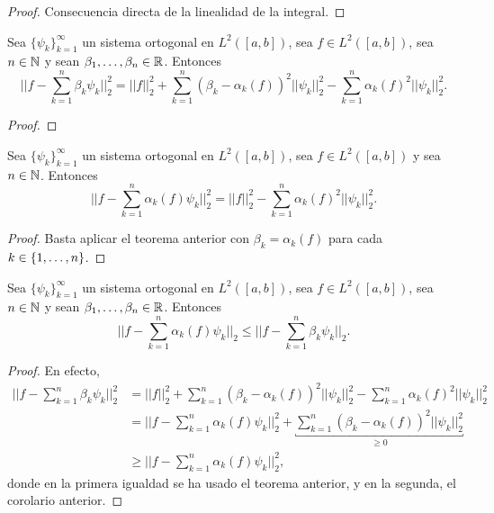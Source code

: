 \documentclass[a4paper, 12pt, extrafontsizes]{memoir}
\begin{document}
\begin{proof}
    Consecuencia directa de la linealidad de la integral.
\end{proof}

\begin{theorem}
    Sea $\{\psi_k\}_{k=1}^\infty$ un sistema ortogonal en $L^2([a,b])$, sea $f \in L^2([a,b])$, sea $n \in \mathbb N$ y sean $\beta_1,\mathellipsis,\beta_n \in \mathbb R$. Entonces
    \[\biggl|\biggl|f-\sum_{k=1}^n \beta_k\psi_k\biggr|\biggr|_2^2 = ||f||_2^2 +\sum_{k=1}^n (\beta_k-\alpha_k(f))^2||\psi_k||_2^2 -\sum_{k=1}^n \alpha_k(f)^2||\psi_k||_2^2.\]
\end{theorem}

\begin{proof}
    
\end{proof}

\begin{corollary}\label{cor:A.1.9}
    Sea $\{\psi_k\}_{k=1}^\infty$ un sistema ortogonal en $L^2([a,b])$, sea $f \in L^2([a,b])$ y sea $n \in \mathbb N$. Entonces
    \[\biggl|\biggl|f-\sum_{k=1}^n \alpha_k(f)\psi_k\biggr|\biggr|_2^2 = ||f||_2^2 -\sum_{k=1}^n \alpha_k(f)^2||\psi_k||_2^2.\]
\end{corollary}

\begin{proof}
    Basta aplicar el teorema anterior con $\beta_k=\alpha_k(f)$ para cada $k \in \{1,\mathellipsis,n\}$.
\end{proof}

\begin{corollary}
    Sea $\{\psi_k\}_{k=1}^\infty$ un sistema ortogonal en $L^2([a,b])$, sea $f \in L^2([a,b])$, sea $n \in \mathbb N$ y sean $\beta_1,\mathellipsis,\beta_n \in \mathbb R$. Entonces
    \[\biggl|\biggl|f-\sum_{k=1}^n \alpha_k(f)\psi_k\biggr|\biggr|_2 \leq \biggl|\biggl|f-\sum_{k=1}^n \beta_k\psi_k\biggr|\biggr|_2.\]
\end{corollary}

\begin{proof}
    En efecto,
    \begin{align*}
        \biggl|\biggl|f-\sum_{k=1}^n \beta_k\psi_k\biggr|\biggr|_2^2 &=  ||f||_2^2+\sum_{k=1}^n (\beta_k-\alpha_k(f))^2||\psi_k||_2^2 -\sum_{k=1}^n \alpha_k(f)^2||\psi_k||_2^2 \\
        &= \biggl|\biggl|f-\sum_{k=1}^n \alpha_k(f)\psi_k\biggr|\biggr|_2^2  +\underbracket{\sum_{k=1}^n (\beta_k-\alpha_k(f))^2||\psi_k||_2^2}_{\geq0} \\
        &\geq  \biggl|\biggl|f-\sum_{k=1}^n \alpha_k(f)\psi_k\biggr|\biggr|_2^2,
    \end{align*}
    donde en la primera igualdad se ha usado el teorema anterior, y en la segunda, el corolario anterior.
\end{proof}
\end{document}
